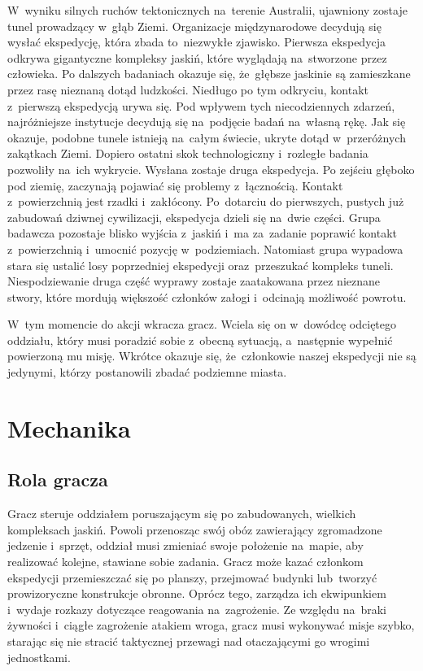\documentclass[licencjacka]{pracamgr}
\begin{document}
    W~wyniku silnych ruchów tektonicznych na~terenie Australii, ujawniony zostaje tunel prowadzący w~głąb Ziemi.
    Organizacje międzynarodowe decydują się wysłać ekspedycję, która zbada to~niezwykłe zjawisko. Pierwsza ekspedycja
    odkrywa gigantyczne kompleksy jaskiń, które wyglądają na~stworzone przez człowieka. Po dalszych badaniach okazuje się,
    że~głębsze jaskinie są zamieszkane przez rasę nieznaną dotąd ludzkości. Niedługo po tym odkryciu, kontakt z~pierwszą
    ekspedycją urywa się. Pod wpływem tych niecodziennych zdarzeń, najróżniejsze instytucje decydują się na~podjęcie badań
    na~własną rękę. Jak się okazuje, podobne tunele istnieją na~całym świecie, ukryte dotąd w~przeróżnych zakątkach Ziemi.
    Dopiero ostatni skok technologiczny i~rozległe badania pozwoliły na~ich wykrycie. Wysłana zostaje druga ekspedycja.
    Po zejściu głęboko pod ziemię, zaczynają pojawiać się problemy z~łącznością. Kontakt z~powierzchnią jest rzadki
    i~zakłócony. Po~dotarciu do pierwszych, pustych już zabudowań dziwnej cywilizacji, ekspedycja dzieli się na~dwie
    części. Grupa badawcza pozostaje blisko wyjścia z~jaskiń i~ma za~zadanie poprawić kontakt z~powierzchnią i~umocnić
    pozycję w~podziemiach. Natomiast grupa wypadowa stara się ustalić losy poprzedniej ekspedycji oraz~przeszukać kompleks
    tuneli. Niespodziewanie druga część wyprawy zostaje zaatakowana przez nieznane stwory, które mordują większość członków
    załogi i~odcinają możliwość powrotu.

    W~tym momencie do akcji wkracza gracz. Wciela się on w~dowódcę odciętego oddziału, który musi poradzić sobie z~obecną
    sytuacją, a~następnie wypełnić powierzoną mu misję. Wkrótce okazuje się, że~członkowie naszej ekspedycji nie są
    jedynymi, którzy postanowili zbadać podziemne miasta.

  \section{Mechanika}
    \subsection{Rola gracza}
      Gracz steruje oddziałem poruszającym się po zabudowanych, wielkich kompleksach jaskiń. Powoli przenosząc swój obóz
      zawierający zgromadzone jedzenie i~sprzęt, oddział musi zmieniać swoje położenie na~mapie, aby realizować kolejne,
      stawiane sobie zadania. Gracz może kazać członkom ekspedycji przemieszczać się po planszy, przejmować budynki
      lub~tworzyć prowizoryczne konstrukcje obronne. Oprócz tego, zarządza ich ekwipunkiem i~wydaje rozkazy dotyczące
      reagowania na~zagrożenie. Ze względu na~braki żywności i~ciągłe zagrożenie atakiem wroga, gracz musi wykonywać misje
      szybko, starając się nie stracić taktycznej przewagi nad otaczającymi go wrogimi jednostkami.
\end{document}
